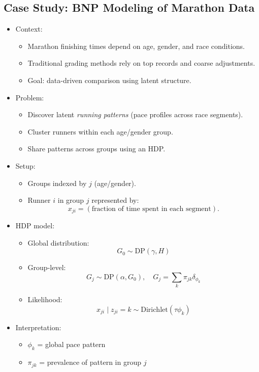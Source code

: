 \documentclass[12pt,oneside]{book}
\numberwithin{equation}{section}
\theoremstyle{definition}
\theoremstyle{plain}
\theoremstyle{remark}
\begin{document}
\subsection{Case Study: BNP Modeling of Marathon Data}

\begin{itemize}
\item Context:
\begin{itemize}
\item Marathon finishing times depend on age, gender, and race conditions.
\item Traditional grading methods rely on top records and coarse adjustments.
\item Goal: data-driven comparison using latent structure.
\end{itemize}

\item Problem:
\begin{itemize}
\item Discover latent \emph{running patterns} (pace profiles across race segments).
\item Cluster runners within each age/gender group.
\item Share patterns across groups using an HDP.
\end{itemize}

\item Setup:
\begin{itemize}
\item Groups indexed by $j$ (age/gender).
\item Runner $i$ in group $j$ represented by:
\[
x_{ji} = (\text{fraction of time spent in each segment}).
\]
\end{itemize}

\item HDP model:
\begin{itemize}
\item Global distribution:
\[
G_0 \sim \text{DP}(\gamma, H)
\]

\item Group-level:
\[
G_j \sim \text{DP}(\alpha, G_0), \quad
G_j = \sum_k \pi_{jk} \delta_{\phi_k}
\]

\item Likelihood:
\[
x_{ji} \mid z_{ji}=k \sim \text{Dirichlet}(\tau \phi_k)
\]
\end{itemize}

\item Interpretation:
\begin{itemize}
\item $\phi_k$ = global pace pattern
\item $\pi_{jk}$ = prevalence of pattern in group $j$
\end{itemize}


\end{itemize}
\end{document}
